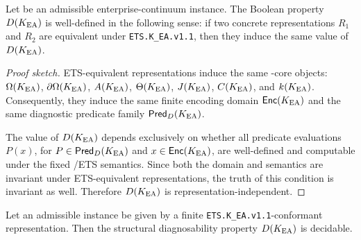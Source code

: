 %
%

\label{sec:theorems}

\begin{theorem}
Let \KEA{} be an admissible enterprise-continuum instance. The Boolean property
\(D(K_{\mathrm{EA}})\) is well-defined in the following sense: if two concrete
representations \(R_1\) and \(R_2\) are equivalent under
\texttt{ETS.K\_EA.v1.1}, then they induce the same value of \(D(K_{\mathrm{EA}})\).
\end{theorem}

\begin{proof}[Proof sketch]
ETS-equivalent representations induce the same \OC{}-core objects:
\(\Omega(K_{\mathrm{EA}})\), \(\partial \Omega(K_{\mathrm{EA}})\), \(A(K_{\mathrm{EA}})\), \(\Theta(K_{\mathrm{EA}})\), \(J(K_{\mathrm{EA}})\),
\(C(K_{\mathrm{EA}})\), and \(k(K_{\mathrm{EA}})\).
Consequently, they induce the same finite encoding domain \(\mathsf{Enc}(K_{\mathrm{EA}})\)
and the same diagnostic predicate family \(\mathsf{Pred}_D(K_{\mathrm{EA}})\).

The value of \(D(K_{\mathrm{EA}})\) depends exclusively on whether all predicate evaluations
\(P(x)\), for \(P \in \mathsf{Pred}_D(K_{\mathrm{EA}})\) and
\(x \in \mathsf{Enc}(K_{\mathrm{EA}})\), are well-defined and computable under the fixed
\OC{}/ETS semantics. Since both the domain and semantics are invariant under
ETS-equivalent representations, the truth of this condition is invariant as
well. Therefore \(D(K_{\mathrm{EA}})\) is representation-independent.
\end{proof}

\begin{theorem}
Let an admissible \KEA{} instance be given by a finite
\texttt{ETS.K\_EA.v1.1}-conformant representation. Then the structural
diagnosability property \(D(K_{\mathrm{EA}})\) is decidable.
\end{theorem}

